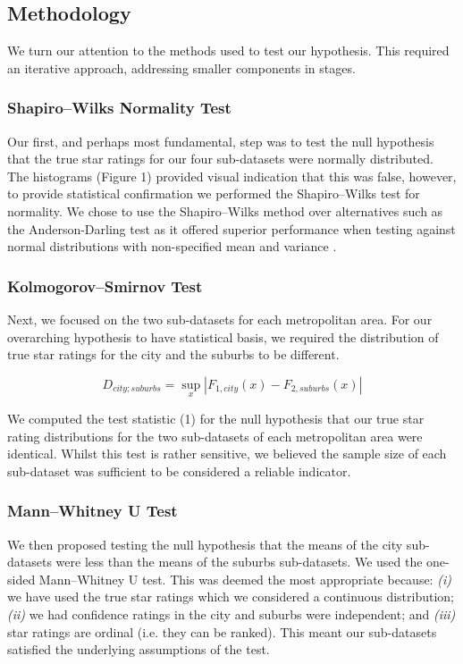 \documentclass{article}
\begin{document}
\subsection{Methodology}
We turn our attention to the methods used to test our hypothesis. This required an iterative approach, addressing smaller components in stages. 

\subsubsection*{Shapiro–Wilks Normality Test}
Our first, and perhaps most fundamental, step was to test the null hypothesis that the true star ratings for our four sub-datasets were normally distributed. The histograms (Figure 1) provided visual indication that this was false, however, to provide statistical confirmation we performed the Shapiro–Wilks test for normality. We chose to use the Shapiro–Wilks method over alternatives such as the Anderson-Darling test as it offered superior performance when testing against normal distributions with non-specified mean and variance \cite{razali2011power}. 

\subsubsection*{Kolmogorov–Smirnov Test}
Next, we focused on the two sub-datasets for each metropolitan area. For our overarching hypothesis to have statistical basis, we required the distribution of true star ratings for the city and the suburbs to be different.\par

\begin{equation}
    D_{city;suburbs} = \sup_{x} | F_{1,city}(x) - F_{2,suburbs}(x) |
\end{equation}

We computed the test statistic (1) for the null hypothesis that our true star rating distributions for the two sub-datasets of each metropolitan area were identical. Whilst this test is rather sensitive, we believed the sample size of each sub-dataset was sufficient to be considered a reliable indicator.

\subsubsection*{Mann–Whitney U Test}
We then proposed testing the null hypothesis that the means of the city sub-datasets were less than the means of the suburbs sub-datasets. We used the one-sided Mann–Whitney U test. This was deemed the most appropriate because: \textit{(i)} we have used the true star ratings which we considered a continuous distribution; \textit{(ii)} we had confidence ratings in the city and suburbs were independent; and \textit{(iii)} star ratings are ordinal (i.e. they can be ranked). This meant our sub-datasets satisfied the underlying assumptions of the test. \par
\end{document}
